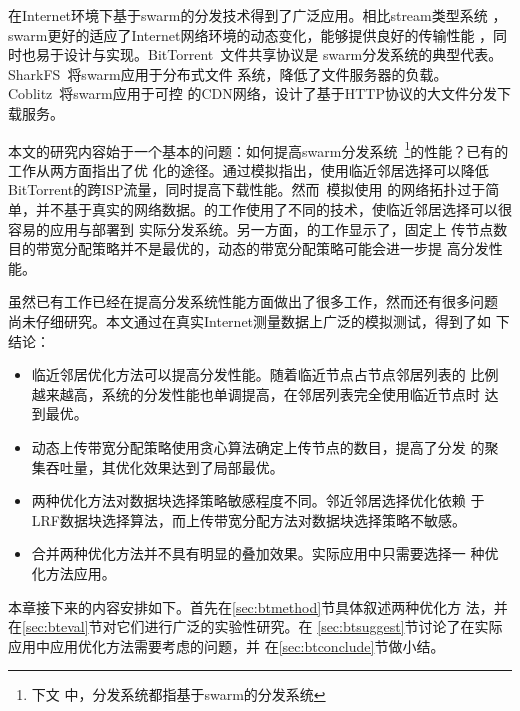 在Internet环境下基于swarm的分发技术得到了广泛应用。相比stream类型系统
，swarm更好的适应了Internet网络环境的动态变化，能够提供良好的传输性能
，同时也易于设计与实现。BitTorrent~\cite{bittorrent}文件共享协议是
swarm分发系统的典型代表。SharkFS~\cite{sharkfs}将swarm应用于分布式文件
系统，降低了文件服务器的负载。Coblitz~\cite{coblitz}将swarm应用于可控
的CDN网络，设计了基于HTTP协议的大文件分发下载服务。

本文的研究内容始于一个基本的问题：如何提高swarm分发系统~\footnote{下文
中，分发系统都指基于swarm的分发系统}的性能？已有的工作从两方面指出了优
化的途径。通过模拟指出，使用临近邻居选择可以降低
BitTorrent的跨ISP流量，同时提高下载性能。然而~模拟使用
的网络拓扑过于简单，并不基于真实的网络数据。的工作使用了不同的技术，使临近邻居选择可以很容易的应用与部署到
实际分发系统。另一方面，的工作显示了，固定上
传节点数目的带宽分配策略并不是最优的，动态的带宽分配策略可能会进一步提
高分发性能。


虽然已有工作已经在提高分发系统性能方面做出了很多工作，然而还有很多问题
尚未仔细研究。本文通过在真实Internet测量数据上广泛的模拟测试，得到了如
下结论：


\begin{itemize}

  \item 临近邻居优化方法可以提高分发性能。随着临近节点占节点邻居列表的
  比例越来越高，系统的分发性能也单调提高，在邻居列表完全使用临近节点时
  达到最优。

  \item 动态上传带宽分配策略使用贪心算法确定上传节点的数目，提高了分发
  的聚集吞吐量，其优化效果达到了局部最优。
  
  \item 两种优化方法对数据块选择策略敏感程度不同。邻近邻居选择优化依赖
  于LRF数据块选择算法，而上传带宽分配方法对数据块选择策略不敏感。

  \item 合并两种优化方法并不具有明显的叠加效果。实际应用中只需要选择一
  种优化方法应用。

\end{itemize}

本章接下来的内容安排如下。首先在\ref{sec:btmethod}节具体叙述两种优化方
法，并在\ref{sec:bteval}节对它们进行广泛的实验性研究。在
\ref{sec:btsuggest}节讨论了在实际应用中应用优化方法需要考虑的问题，并
在\ref{sec:btconclude}节做小结。


